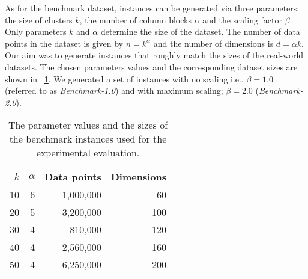 As for the benchmark dataset, instances can be generated via three parameters; the size of clusters $k$, the number of column blocks $\alpha$ and the scaling factor $\beta$. Only parameters $k$ and $\alpha$ determine the size of the dataset. The number of data points in the dataset is given by $n=k^{\alpha}$ and the number of dimensions is $d=\alpha k$. Our aim was to generate instances that roughly match the sizes of the real-world datasets. The chosen parameters values and the corresponding dataset sizes are shown in ~\cref{tab:benchmark-instances-overview}. We generated a set of instances with no scaling i.e., $\beta=1.0$ (referred to as \textit{Benchmark-1.0}) and with maximum scaling; $\beta = 2.0$ (\textit{Benchmark-2.0}).



%
\begin{table}
	\begin{center}%
	\caption{The parameter values and the sizes of the benchmark instances used for the experimental evaluation.}
	\label{tab:benchmark-instances-overview}
	\begin{tabular}{rrrr}
		\toprule
        $k$
		    & $\alpha$
		    & Data points
		    & Dimensions
            \\
		\midrule
        10
    		& 6
    		& 1,000,000
    		& 60
    		\\
        20
    		& 5
    		& 3,200,000
    		& 100
    		\\
        30
    		& 4
    		& 810,000
    		& 120
    		\\
        40
    		& 4
    		& 2,560,000
    		& 160
    		\\
        50
    		& 4
    		& 6,250,000
    		& 200
    		\\
		\bottomrule
	\end{tabular}\\
	\end{center}
\end{table}
